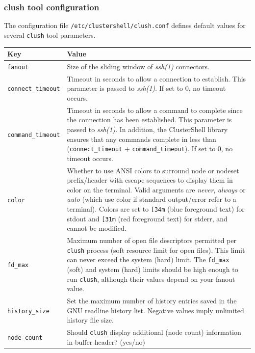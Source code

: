 \documentclass[english,a4paper]{csuserguide}
\newcommand{\clush}{\texttt{clush}\xspace}
\begin{document}
\subsubsection{clush tool configuration}

The configuration file \verb+/etc/clustershell/clush.conf+ defines default values for several \clush tool parameters.

\begin{center}
\begin{tabular}{|p{3.2cm}|p{12.8cm}|} 
\hline 
\textbf{Key} & \textbf{Value} \\
\hline
\verb+fanout+& Size of the sliding window of \textit{ssh(1)} connectors.\\
\hline
\verb+connect_timeout+ & Timeout  in  seconds  to  allow a connection to establish. This parameter is passed to \textit{ssh(1)}. If set to 0, no timeout occurs.\\
\hline
\verb+command_timeout+ & Timeout in seconds to allow a command to complete since the connection has been established. This parameter is passed to \textit{ssh(1)}.  In addition, the ClusterShell library ensures that any commands complete in less than (\verb+connect_timeout+ + \verb+command_timeout+). If set to 0, no timeout occurs.\\
\hline
\verb+color+ & Whether  to  use  ANSI  colors  to  surround node or nodeset prefix/header with escape sequences to display them in color on the terminal. Valid arguments are \textit{never},  \textit{always} or \textit{auto} (which use color if standard output/error refer to a terminal). Colors are set to \verb+[34m+ (blue foreground text) for stdout and \verb+[31m+ (red foreground text)  for  stderr, and cannot be modified.\\
\hline
\verb+fd_max+ & Maximum  number  of  open  file descriptors permitted per \clush process (soft resource limit for open files). This limit can never exceed the system (hard) limit. The \verb+fd_max+ (soft)  and  system  (hard)  limits should be high enough to run \clush, although their values depend on your fanout value.\\
\hline
\verb+history_size+ & Set the maximum number of history entries saved in the GNU readline history list. Negative values imply unlimited history file size.\\
\hline
\verb+node_count+ & Should \clush display additional (node count) information in buffer header? (yes/no)\\
\hline

\end{tabular}
\end{center}
\end{document}
